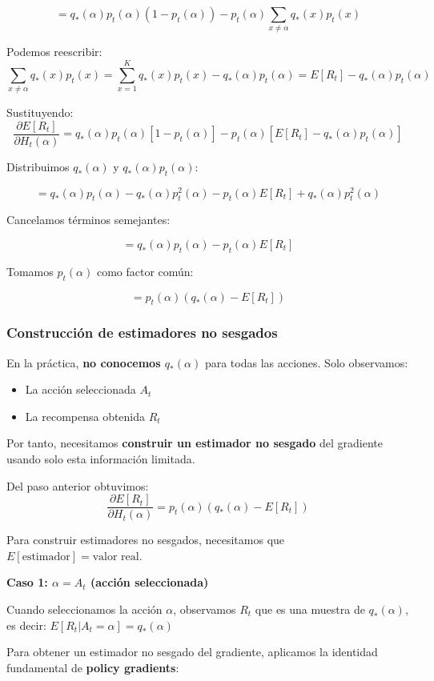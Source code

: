\documentclass[12pt,a4paper]{article}
\begin{document}
$$= q_*(\alpha)p_t(\alpha)(1 - p_t(\alpha)) - p_t(\alpha)\sum_{x \neq \alpha} q_*(x)p_t(x)$$

Podemos reescribir:
$$\sum_{x \neq \alpha} q_*(x)p_t(x) = \sum_{x=1}^{K} q_*(x)p_t(x) - q_*(\alpha)p_t(\alpha) = E[R_t] - q_*(\alpha)p_t(\alpha)$$

Sustituyendo:
$$\frac{\partial E[R_t]}{\partial H_t(\alpha)} = q_*(\alpha)p_t(\alpha)[1 - p_t(\alpha)] - p_t(\alpha)[E[R_t] - q_*(\alpha)p_t(\alpha)]$$

Distribuimos $q_*(\alpha)$ y $q_*(\alpha)p_t(\alpha)$:

$$= q_*(\alpha)p_t(\alpha) - q_*(\alpha)p_t^2(\alpha) - p_t(\alpha)E[R_t] + q_*(\alpha)p_t^2(\alpha)$$

Cancelamos términos semejantes:

$$= q_*(\alpha)p_t(\alpha) - p_t(\alpha)E[R_t]$$

Tomamos $p_t(\alpha)$ como factor común:

$$= p_t(\alpha)(q_*(\alpha) - E[R_t])$$

\subsubsection{Construcción de estimadores no sesgados}

En la práctica, \textbf{no conocemos $q_*(\alpha)$} para todas las acciones. Solo observamos:
\begin{itemize}
    \item La acción seleccionada $A_t$
    \item La recompensa obtenida $R_t$
\end{itemize}

Por tanto, necesitamos \textbf{construir un estimador no sesgado} del gradiente usando solo esta información limitada.

Del paso anterior obtuvimos:
$$\frac{\partial E[R_t]}{\partial H_t(\alpha)} = p_t(\alpha)(q_*(\alpha) - E[R_t])$$

Para construir estimadores no sesgados, necesitamos que $E[\text{estimador}] = \text{valor real}$.

\textbf{Caso 1: $\alpha = A_t$ (acción seleccionada)}

Cuando seleccionamos la acción $\alpha$, observamos $R_t$ que es una muestra de $q_*(\alpha)$, es decir:
$E[R_t | A_t = \alpha] = q_*(\alpha)$

Para obtener un estimador no sesgado del gradiente, aplicamos la identidad fundamental de \textbf{policy gradients}:
\end{document}
